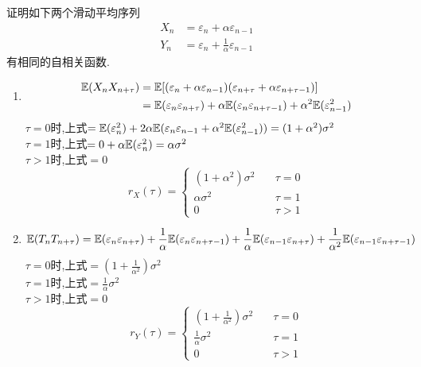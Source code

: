 \begin{problem}{4.34}
证明如下两个滑动平均序列
\[\begin{split}
		X_n & = \varepsilon_n + \alpha \varepsilon_{n-1}\\
		Y_n & = \varepsilon_n + \frac{1}{\alpha}\varepsilon_{n-1}
	\end{split}\]
有相同的自相关函数.
\end{problem}
\begin{solution}
	\begin{enumerate}[label=(\roman*)]
		\item \[\begin{split}
				      \mathbb{E}(X_n X_{n+\tau}) &= \mathbb{E}[(\varepsilon_n+\alpha\varepsilon_{n-1})(\varepsilon_{n+\tau}+\alpha\varepsilon_{n+\tau-1})]\\
				      &=\mathbb{E}(\varepsilon_n \varepsilon _{n+\tau})+\alpha\mathbb{E}(\varepsilon_n \varepsilon_{n+\tau-1})+\alpha^2\mathbb{E}(\varepsilon_{n-1}^2)\\
			      \end{split}\]
		      $\tau=0$时,上式$=\mathbb{E}(\varepsilon_n^2)+2\alpha\mathbb{E}(\varepsilon_n \varepsilon_{n-1}+\alpha^2 \mathbb{E}(\varepsilon_{n-1}^2))=(1+\alpha^2)\sigma^2$\\
		      $\tau=1$时,上式$=0+\alpha\mathbb{E}(\varepsilon_n^2) = \alpha\sigma^2$\\
		      $\tau>1$时,上式$=0$
		      \[r_X(\tau)=\begin{cases}
				      (1+\alpha^2)\sigma^2 \quad & \tau=0 \\
				      \alpha\sigma^2             & \tau=1 \\
				      0                          & \tau>1
			      \end{cases}\]
		\item \[\mathbb{E}(T_n T_{n+\tau}) = \mathbb{E}(\varepsilon_n \varepsilon_{n+\tau})+\frac{1}{\alpha}\mathbb{E}(\varepsilon_n \varepsilon_{n+\tau-1})+\frac{1}{\alpha}\mathbb{E}(\varepsilon_{n-1}\varepsilon_{n+\tau})+\frac{1}{\alpha^2}\mathbb{E}(\varepsilon_{n-1}\varepsilon_{n+\tau-1})\]
		      $\tau=0$时,上式$=(1+\frac{1}{\alpha^2})\sigma^2$\\
		      $\tau=1$时,上式$=\frac{1}{\alpha}\sigma^2$\\
		      $\tau>1$时,上式$=0$
		      \[r_Y(\tau)=\begin{cases}
				      (1+\frac{1}{\alpha^2})\sigma^2 \quad & \tau=0 \\
				      \frac{1}{\alpha}\sigma^2             & \tau=1 \\
				      0                                    & \tau>1
			      \end{cases}\]

\end{enumerate}
\end{solution}
